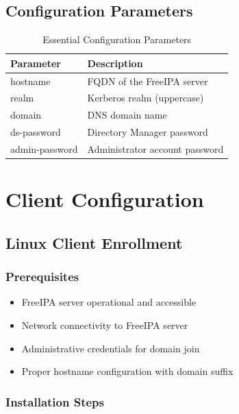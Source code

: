 \documentclass[12pt,a4paper]{report}
\begin{document}
\section{Configuration Parameters}

\begin{table}[H]
    \centering
    \caption{Essential Configuration Parameters}
    \label{tab:config}
    \begin{tabular}{ll}
        \toprule
        \textbf{Parameter} & \textbf{Description} \\
        \midrule
        hostname & FQDN of the FreeIPA server \\
        realm & Kerberos realm (uppercase) \\
        domain & DNS domain name \\
        ds-password & Directory Manager password \\
        admin-password & Administrator account password \\
        \bottomrule
    \end{tabular}
\end{table}

\chapter{Client Configuration}

\section{Linux Client Enrollment}

\subsection{Prerequisites}

\begin{itemize}
    \item FreeIPA server operational and accessible
    \item Network connectivity to FreeIPA server
    \item Administrative credentials for domain join
    \item Proper hostname configuration with domain suffix
\end{itemize}

\subsection{Installation Steps}
\end{document}
